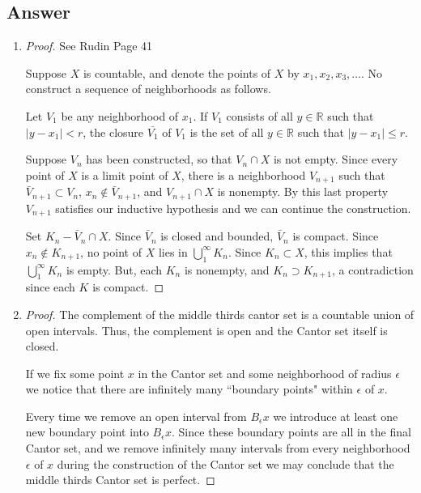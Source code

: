 \documentclass[12pt]{article}
\begin{document}
\subsection{Answer}
\begin{enumerate}
\item
\begin{proof}
See Rudin Page 41

Suppose $X$ is countable, and denote the points of $X$ by $x_1, x_2, x_3, \dots$. No construct a sequence of neighborhoods as follows.

Let $V_1$ be any neighborhood of $x_1$. If $V_1$ consists of all $y \in \mathbb{R}$ such that $|y -x_1|<r$, the closure $\bar{V_1}$ of $V_1$ is the set of all $y \in \mathbb{R}$ such that $|y-x_1|\leq r$.

Suppose $V_n$ has been constructed, so that $V_n \cap X$ is not empty. Since every point of $X$ is a limit point of $X$, there is a neighborhood $V_{n+1}$ such that $\bar{V}_{n+1} \subset V_n$, $x_n \notin \bar{V}_{n+1}$, and $V_{n+1}\cap X$ is nonempty.  By this last property $V_{n+1}$ satisfies our inductive hypothesis and we can continue the construction.

Set $K_n-\bar{V}_n \cap X$. Since $\bar{V}_n$ is closed and bounded, $\bar{V}_n$ is compact. Since $x_n \notin K_{n+1}$, no point of $X$ lies in $\bigcup_1^\infty K_n$. Since $K_n \subset X$, this implies that $\bigcup_1^\infty K_n$ is empty. But, each $K_n$ is nonempty, and $K_n \supset K_{n+1}$, a contradiction since each $K$ is compact.

 \end{proof}
\item
\begin{proof}
The complement of the middle thirds cantor set is a countable union of open intervals. Thus, the complement is open and the Cantor set itself is closed. 

If we fix some point $x$ in the Cantor set and some neighborhood of radius $\epsilon$ we notice that there are infinitely many ``boundary points" within $\epsilon$ of $x$. 

Every time we remove an open interval from $B_\epsilon x$ we introduce at least one new boundary point into $B_\epsilon x$. Since these boundary points are all in the final Cantor set, and we remove infinitely many intervals from every neighborhood $\epsilon$ of $x$ during the construction of the Cantor set we may conclude that the middle thirds Cantor set is perfect.
\end{proof}
\end{enumerate}
\end{document}
